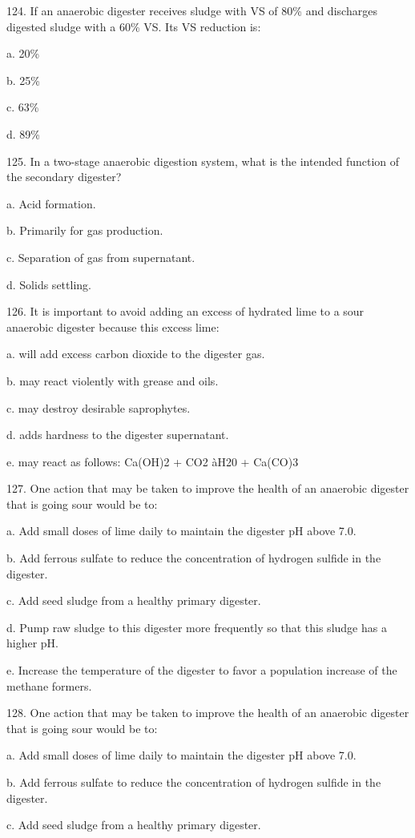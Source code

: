 \documentclass{article}
\begin{document}
124. If an anaerobic digester receives sludge with VS of 80\% and discharges digested sludge with a 60\% VS. Its VS reduction is: 

a. 20\% 

b. 25\% 

c. 63\% 

d. 89\% 


125. In a two-stage anaerobic digestion system, what is the intended function of the secondary digester? 

a. Acid formation. 

b. Primarily for gas production. 

c. Separation of gas from supernatant. 

d. Solids settling. 


126. It is important to avoid adding an excess of hydrated lime to a sour anaerobic digester because this excess lime: 

a. will add excess carbon dioxide to the digester gas. 

b. may react violently with grease and oils. 

c. may destroy desirable saprophytes. 

d. adds hardness to the digester supernatant. 

e. may react as follows: Ca(OH)2 + CO2
àH20 + Ca(CO)3 


127. One action that may be taken to improve the health of an anaerobic digester that is going sour would be to: 

a. Add small doses of lime daily to maintain the digester pH above 7.0. 

b. Add ferrous sulfate to reduce the concentration of hydrogen sulfide in the digester. 

c. Add seed sludge from a healthy primary digester. 

d. Pump raw sludge to this digester more frequently so that this sludge has a higher pH. 

e. Increase the temperature of the digester to favor a population increase of the methane formers. 


128. One action that may be taken to improve the health of an anaerobic digester that is going sour would be to: 

a. Add small doses of lime daily to maintain the digester pH above 7.0. 

b. Add ferrous sulfate to reduce the concentration of hydrogen sulfide in the digester. 

c. Add seed sludge from a healthy primary digester. 
\end{document}
